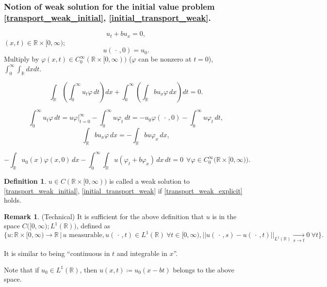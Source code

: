 \documentclass[12pt]{article}
\theoremstyle{definition}
\newtheorem*{definition*}{Definition}
\newtheorem*{remark}{Remark}
\begin{document}
\subsubsection*{Notion of weak solution for the initial value problem \textbf{\eqref{transport_weak_initial}}, \textbf{\eqref{initial_transport_weak}}.}
\begin{equation}\tag{T}\label{transport_weak_initial}
u_t+bu_x=0,
\end{equation}
$(x,t)\in\mathbb R\times[0,\infty)$;
\begin{equation}\tag{IC}\label{initial_transport_weak}
u(\,\cdot\,,0)=u_0.
\end{equation}
Multiply by $\varphi(x,t)\in C_0^\infty(\mathbb R\times[0,\infty))$ ($\varphi$ can be nonzero at $t=0$), $\int_0^\infty\int_\mathbb Rdxdt$.

\[\int_\mathbb R\left(\int_0^\infty u_t\varphi\,dt\right)dx+\int_0^\infty\left(\int_\mathbb Rbu_x\varphi\,dx\right)dt=0.\]

\[\int_0^\infty u_t\varphi\,dt=u\varphi\Big|_{t=0}^\infty-\int_0^\infty u\varphi_t\,dt=-u_0\varphi(\,\cdot\,,0)-\int_0^\infty u\varphi_t\,dt,\]
\[\int_\mathbb Rbu_x\varphi\,dx=-\int_\mathbb Rbu\varphi_x\,dx,\]

\begin{equation}\tag{$*$}\label{transport_weak_explicit}
-\int_\mathbb Ru_0(x)\varphi(x,0)\,dx-\int_0^\infty\int_\mathbb Ru(\varphi_t+b\varphi_x)\,dx\,dt=0\ \ \forall\varphi\in C_0^\infty\big(\mathbb R\times[0,\infty)\big).
\end{equation}

\begin{definition*}
$u\in C(\mathbb R\times[0,\infty))$ is called a weak solution to \eqref{transport_weak_initial}, \eqref{initial_transport_weak} if \eqref{transport_weak_explicit} holds.
\end{definition*}

\begin{remark}
(Technical) It is sufficient for the above definition that $u$ is in the space $C\big([0,\infty);L^1(\mathbb R)\big)$, defined as
\[\Big\{u:\mathbb R\times[0,\infty)\rightarrow\mathbb R\,\Big|\,u\text{ measurable},u(\,\cdot\,,t)\in L^1(\mathbb R)\ \forall t\in[0,\infty),\big|\big|u(\,\cdot\,,s)-u(\,\cdot\,,t)\big|\big|_{L^1(\mathbb R)}\xrightarrow[s\to t]{}0\ \forall t\Big\}.\]

It is similar to being ``continuous in $t$ and integrable in $x$''.

Note that if $u_0\in L^1(\mathbb R)$, then $u(x,t)\coloneqq u_0(x-bt)$ belongs to the above space.
\end{remark}
\end{document}
